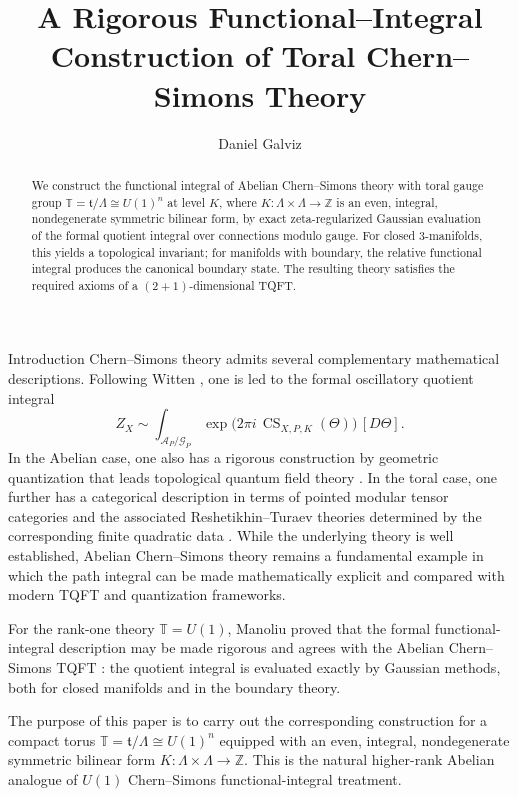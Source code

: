 \documentclass[12pt]{amsart}
\title[Functional--Integral Construction of Toral Chern--Simons Theory]{A Rigorous Functional--Integral Construction of Toral Chern--Simons Theory}
\author{Daniel Galviz}
\date{}
\makeatletter
\renewcommand\section{\@startsection{section}{1}%
  \z@{.7\linespacing\@plus\linespacing}{.5\linespacing}%
  {\normalfont\bfseries\centering}}
\numberwithin{equation}{section}
\makeatother
\begin{document}
\begin{abstract}
We construct the functional integral of Abelian Chern--Simons theory with toral gauge group $\mathbb T=\mathfrak t/\Lambda \cong U(1)^n$ at level $K$, where $K:\Lambda\times\Lambda\to\mathbb Z$ is an even, integral, nondegenerate symmetric bilinear form, by exact zeta-regularized Gaussian evaluation of the formal quotient integral over connections modulo gauge. For closed $3$-manifolds, this yields a topological invariant; for manifolds with boundary, the relative functional integral produces the canonical boundary state. The resulting theory satisfies the required axioms of a $(2+1)$-dimensional TQFT.
\end{abstract}
\maketitle
{\scriptsize
\setlength{\parskip}{0pt}
\hypersetup{linkcolor=black}
\tableofcontents
}
\section{Introduction}
Chern--Simons theory admits several complementary mathematical descriptions.
Following Witten \cite{Witten:1988}, one is led to the formal oscillatory quotient integral
\[
Z_X
\sim
\int_{\mathcal A_P/\mathcal G_P}
\exp\!\bigl(2\pi i\,\operatorname{CS}_{X,P,K}(\Theta)\bigr)\,[D\Theta].
\]
In the Abelian case, one also has a rigorous construction by geometric quantization that leads
topological quantum field theory \cite{Manoliu1,Galviz2}. In the toral case, one further has
a categorical description in terms of pointed modular tensor categories and the associated
Reshetikhin--Turaev theories determined by the corresponding finite quadratic data
\cite{Reshetikhin:1991,Galviz1,Galviz3}. While the underlying theory is well established, Abelian Chern–Simons theory remains a fundamental example in which the path integral can be made mathematically explicit and compared with modern TQFT and quantization frameworks.
 
For the rank-one theory \(\mathbb T=U(1)\), Manoliu proved that the formal
functional-integral description may be made rigorous and agrees with the Abelian
Chern--Simons TQFT \cite{Manoliu2,Manoliu3}: the quotient integral is evaluated exactly by
Gaussian methods, both for closed manifolds and in the boundary theory.

The purpose of this paper is to carry out the corresponding construction for a compact torus $\mathbb T=\mathfrak t/\Lambda \cong U(1)^n$ equipped with an even, integral, nondegenerate symmetric bilinear form $K:\Lambda\times\Lambda\to\mathbb Z.$ This is the natural higher-rank Abelian analogue of  $U(1)$ Chern--Simons functional-integral treatment. 
\end{document}

